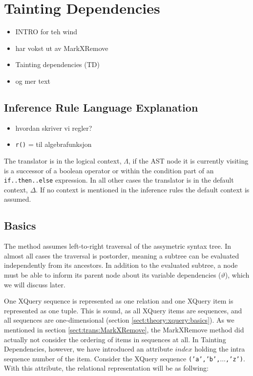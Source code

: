 \section{Tainting Dependencies}
\label{sect:trans:taintingDependencies}

\begin{itemize}
  \item INTRO for teh wind
  \item har vokst ut av MarkXRemove
  \item Tainting dependencies (TD)
  \item og mer text
\end{itemize}

\subsection{Inference Rule Language Explanation}
\label{sect:trans:TD:langExpl}
\begin{itemize}
  \item hvordan skriver vi regler?
  \item \texttt{r()} = til algebrafunksjon
\end{itemize}

The translator is in the logical context, $\Lambda$, if the AST node it is currently visiting is a successor of a
boolean operator or within the condition part of an \texttt{if..then..else} expression. In all other cases the
translator is in the default context, $\Delta$. If no context is mentioned in the inference rules the default
context is assumed.

\subsection{Basics}
\label{sect:trans:TD:basics}
The method assumes left-to-right traversal of the assymetric syntax tree. In almost all cases the traversal is
postorder, meaning a subtree can be evaluated independently from its ancestors. In addition to the evaluated
subtree, a node must be able to inform its parent node about its variable dependencies ($\vartheta$), which we will
discuss later.

One XQuery sequence is represented as one relation and one XQuery item is represented as one tuple. This is sound,
as all XQuery items are sequences, and all sequences are one-dimensional (section
\ref{sect:theory:xquery:basics}). As we mentioned in section \ref{sect:trans:MarkXRemove}, the MarkXRemove method
did actually not consider the ordering of items in sequences at all. In Tainting Dependencies, however, we have
introduced an attribute $index$ holding the intra sequence number of the item. Consider the XQuery sequence
\texttt{('a','b',}$\ldots$\texttt{,'z')}. With this attribute, the relational representation will be as follwing:

